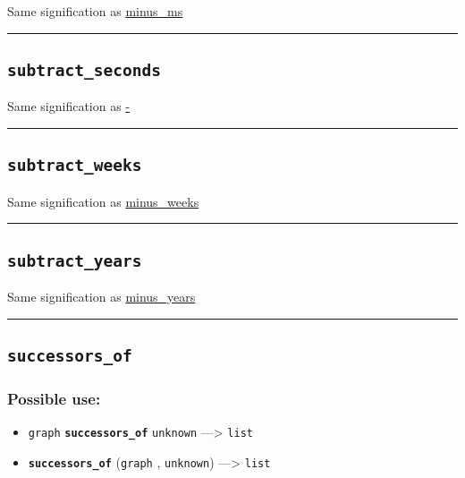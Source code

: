 \documentclass[]{book}
\providecommand{\tightlist}{%
  \setlength{\itemsep}{0pt}\setlength{\parskip}{0pt}}
\theoremstyle{definition}
\theoremstyle{definition}
\theoremstyle{definition}
\theoremstyle{remark}
\begin{document}
Same signification as \href{OperatorsIM\#minus_ms}{minus\_ms}

\begin{center}\rule{0.5\linewidth}{\linethickness}\end{center}

\subsection{\texorpdfstring{\texttt{subtract\_seconds}}{subtract\_seconds}}\label{subtract_seconds}

Same signification as \href{OperatorsAA\#-}{-}

\begin{center}\rule{0.5\linewidth}{\linethickness}\end{center}

\subsection{\texorpdfstring{\texttt{subtract\_weeks}}{subtract\_weeks}}\label{subtract_weeks}

Same signification as \href{OperatorsIM\#minus_weeks}{minus\_weeks}

\begin{center}\rule{0.5\linewidth}{\linethickness}\end{center}

\subsection{\texorpdfstring{\texttt{subtract\_years}}{subtract\_years}}\label{subtract_years}

Same signification as \href{OperatorsIM\#minus_years}{minus\_years}

\begin{center}\rule{0.5\linewidth}{\linethickness}\end{center}

\subsection{\texorpdfstring{\texttt{successors\_of}}{successors\_of}}\label{successors_of}

\subsubsection{Possible use:}\label{possible-use-508}

\begin{itemize}
\tightlist
\item
  \texttt{graph} \textbf{\texttt{successors\_of}} \texttt{unknown}
  ---\textgreater{} \texttt{list}
\item
  \textbf{\texttt{successors\_of}} (\texttt{graph} , \texttt{unknown})
  ---\textgreater{} \texttt{list}
\end{itemize}
\end{document}
